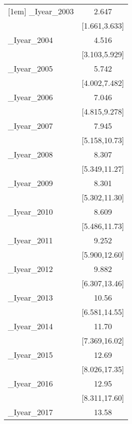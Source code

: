 {\begin{tabular}{l*{1}{c}}
[1em]
\_Iyear\_2003 &                 2.647\sym{***}\\
            &         [1.661,3.633]         \\
[1em]
\_Iyear\_2004 &                 4.516\sym{***}\\
            &         [3.103,5.929]         \\
[1em]
\_Iyear\_2005 &                 5.742\sym{***}\\
            &         [4.002,7.482]         \\
[1em]
\_Iyear\_2006 &                 7.046\sym{***}\\
            &         [4.815,9.278]         \\
[1em]
\_Iyear\_2007 &                 7.945\sym{***}\\
            &         [5.158,10.73]         \\
[1em]
\_Iyear\_2008 &                 8.307\sym{***}\\
            &         [5.349,11.27]         \\
[1em]
\_Iyear\_2009 &                 8.301\sym{***}\\
            &         [5.302,11.30]         \\
[1em]
\_Iyear\_2010 &                 8.609\sym{***}\\
            &         [5.486,11.73]         \\
[1em]
\_Iyear\_2011 &                 9.252\sym{***}\\
            &         [5.900,12.60]         \\
[1em]
\_Iyear\_2012 &                 9.882\sym{***}\\
            &         [6.307,13.46]         \\
[1em]
\_Iyear\_2013 &                 10.56\sym{***}\\
            &         [6.581,14.55]         \\
[1em]
\_Iyear\_2014 &                 11.70\sym{***}\\
            &         [7.369,16.02]         \\
[1em]
\_Iyear\_2015 &                 12.69\sym{***}\\
            &         [8.026,17.35]         \\
[1em]
\_Iyear\_2016 &                 12.95\sym{***}\\
            &         [8.311,17.60]         \\
[1em]
\_Iyear\_2017 &                 13.58\sym{***}\\

\end{tabular}}
